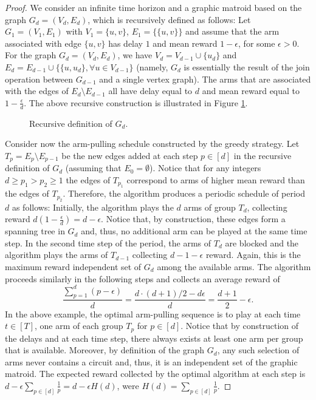 \begin{proof}
We consider an infinite time horizon and a graphic matroid based on the graph $G_d = (V_d, E_d)$, which is recursively defined as follows: Let $G_1 = (V_1, E_1)$ with $V_1 = \{u,v\}$, $E_1 = \{\{u,v\}\}$ and assume that the arm associated with edge $\{u,v\}$ has delay $1$ and mean reward $1-\epsilon$, for some $\epsilon > 0$. For the graph $G_d = (V_d, E_d)$, we have $V_d = V_{d-1} \cup \{u_d\}$ and $E_d = E_{d-1} \cup \{\{u,u_d\}, \forall u \in V_{d-1}\}$ (namely, $G_d$ is essentially the result of the join operation between $G_{d-1}$ and a single vertex graph). The arms that are associated with the edges of $E_{d} \setminus E_{d-1}$ all have delay equal to $d$ and mean reward equal to $1- \frac{\epsilon}{d}$. The above recursive construction is illustrated in Figure \ref{fig:graphicmatroid}.

\begin{figure}[h]
\centering

\caption{Recursive definition of $G_d$.}
\label{fig:graphicmatroid}
\end{figure}

Consider now the arm-pulling schedule constructed by the greedy strategy. Let $T_p = E_p \setminus E_{p-1}$ be the new edges added at each step $p \in [d]$ in the recursive definition of $G_d$ (assuming that $E_0 = \emptyset$). Notice that for any integers $d \geq p_1 > p_2 \geq 1$ the edges of $T_{p_1}$ correspond to arms of higher mean reward than the edges of $T_{p_2}$. Therefore, the algorithm produces a periodic schedule of period $d$ as follows: Initially, the algorithm plays the $d$ arms of group $T_d$, collecting reward $d\left( 1 - \frac{\epsilon}{d}\right) = d - \epsilon$. Notice that, by construction, these edges form a spanning tree in $G_{d}$ and, thus, no additional arm can be played at the same time step. In the second time step of the period, the arms of $T_d$ are blocked and the algorithm plays the arms of $T_{d-1}$ collecting $d-1-\epsilon$ reward. Again, this is the maximum reward independent set of $G_d$ among the available arms. The algorithm proceeds similarly in the following steps and collects an average reward of 
$$
\frac{\sum^d_{p=1}(p-\epsilon)}{d} = \frac{d\cdot(d+1)/2-d\epsilon}{d} = \frac{d+1}{2} - \epsilon.
$$
In the above example, the optimal arm-pulling sequence is to play at each time $t \in [T]$, one arm of each group $T_p$ for $p \in [d]$. Notice that by construction of the delays and at each time step, there always exists at least one arm per group that is available. Moreover, by definition of the graph $G_d$, any such selection of arms never contains a circuit and, thus, it is an independent set of the graphic matroid. The expected reward collected by the optimal algorithm at each step is $d - \epsilon\sum_{p \in [d]}\frac{1}{p} = d - \epsilon H(d)$, were $H(d) = \sum_{p \in [d]}\frac{1}{p}$. 


\end{proof}
